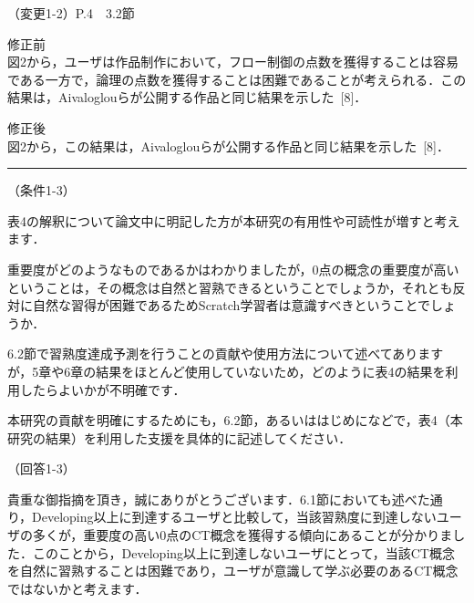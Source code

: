 \documentclass{jarticle} %
\def\subsection#1{ \vspace{1pc} {\gt #1} }
\def\nextans{ \vspace{2pc} \hrule }
\begin{document}
\subsection{（変更1-2）P.4　3.2節 }
\vspace{-0.3cm}
\begin{description}
\item 修正前\\
\phantom{　}
図2から，ユーザは作品制作において，フロー制御の点数を獲得することは容易である一方で，論理の点数を獲得することは困難であることが考えられる．この結果は，Aivaloglouらが公開する作品と同じ結果を示した~[8]．
\vspace{-0.3cm}
\item 修正後\\
\phantom{　}
図2から，\textcolor{red}{}この結果は，Aivaloglouらが公開する作品と同じ結果を示した~[8]．
\end{description}


\newpage
\nextans
\subsection{（条件1-3）}

表4の解釈について論文中に明記した方が本研究の有用性や可読性が増すと考えます．

重要度がどのようなものであるかはわかりましたが，0点の概念の重要度が高いということは，その概念は自然と習熟できるということでしょうか，それとも反対に自然な習得が困難であるためScratch学習者は意識すべきということでしょうか．

6.2節で習熟度達成予測を行うことの貢献や使用方法について述べてありますが，5章や6章の結果をほとんど使用していないため，どのように表4の結果を利用したらよいかが不明確です．

本研究の貢献を明確にするためにも，6.2節，あるいははじめになどで，表4（本研究の結果）を利用した支援を具体的に記述してください．

\subsection{（回答1-3）}

貴重な御指摘を頂き，誠にありがとうございます．6.1節においても述べた通り，Developing以上に到達するユーザと比較して，当該習熟度に到達しないユーザの多くが，重要度の高い0点のCT概念を獲得する傾向にあることが分かりました．このことから，Developing以上に到達しないユーザにとって，当該CT概念を自然に習熟することは困難であり，ユーザが意識して学ぶ必要のあるCT概念ではないかと考えます．
\end{document}
